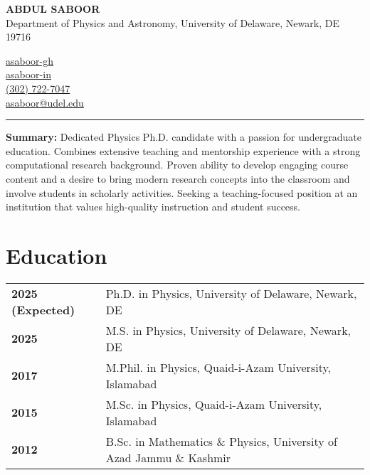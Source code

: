 \documentclass[letter,11pt]{article}
\begin{document}
\begin{minipage}{0.65\textwidth}
    \raggedright
    {\Large \textbf{ABDUL SABOOR}} \\ 
    Department of Physics and Astronomy, University of Delaware, Newark, DE 19716 
\end{minipage}
\hfill
\begin{minipage}{0.3\textwidth}
    \raggedright
    \faGithub \quad \href{https://github.com/asaboor-gh}{asaboor-gh}\\
    \faLinkedin \quad \href{https://linkedin.com/in/asaboor-in}{asaboor-in} \\
    \faPhone \quad \href{tel:+13027227047}{(302) 722-7047} \\
    \faEnvelope \quad \href{mailto:asaboor@udel.edu}{asaboor@udel.edu}
\end{minipage}
\vspace{2mm}
\hrule
\vspace{4mm} 

\noindent
\textbf{Summary:} Dedicated Physics Ph.D. candidate with a passion for undergraduate education. Combines extensive teaching and mentorship experience with a strong computational research background. Proven ability to develop engaging course content and a desire to bring modern research concepts into the classroom and involve students in scholarly activities. Seeking a teaching-focused position at an institution that values high-quality instruction and student success.

\section{Education}
\begin{tabular}{p{3.25cm} p{12cm}}
    \textbf{2025 (Expected)} & Ph.D. in Physics, University of Delaware, Newark, DE \\
    \textbf{2025} & M.S. in Physics, University of Delaware, Newark, DE \\
    \textbf{2017} & M.Phil. in Physics, Quaid-i-Azam University, Islamabad \\
    \textbf{2015} & M.Sc. in Physics, Quaid-i-Azam University, Islamabad \\
    \textbf{2012} & B.Sc. in Mathematics \& Physics, University of Azad Jammu \& Kashmir \\
\end{tabular}
\end{document}
